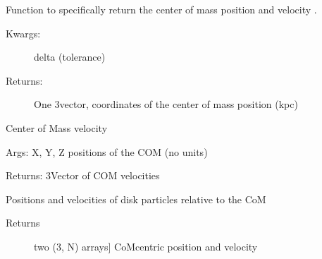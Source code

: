 \documentclass[letterpaper,10pt,english]{sphinxmanual}
\begin{document}
\begin{fulllineitems}
\begin{fulllineitems}
\end{fulllineitems}


\begin{fulllineitems}
\label{\detokenize{centerofmass:galaxy.centerofmass.CenterOfMass.com_p}}
Function to specifically return the center of mass position and velocity    .
\begin{description}
\item[{Kwargs:                                                                                                           }] \leavevmode
delta (tolerance)

\item[{Returns: }] \leavevmode
One 3\sphinxhyphen{}vector, coordinates of the center of mass position (kpc)

\end{description}

\end{fulllineitems}


\begin{fulllineitems}
\label{\detokenize{centerofmass:galaxy.centerofmass.CenterOfMass.com_v}}
Center of Mass velocity

Args: X, Y, Z positions of the COM (no units)

Returns: 3\sphinxhyphen{}Vector of COM velocities

\end{fulllineitems}


\begin{fulllineitems}
\label{\detokenize{centerofmass:galaxy.centerofmass.CenterOfMass.center_com}}
Positions and velocities of disk particles relative to the CoM
\begin{description}
\item[{Returns}] \leavevmode{[}two (3, N) arrays{]}
CoM\sphinxhyphen{}centric position and velocity


\end{description}
\end{fulllineitems}
\end{fulllineitems}
\end{document}
